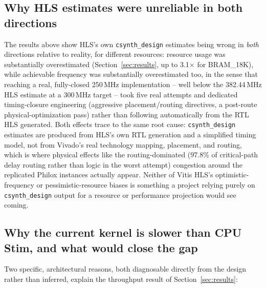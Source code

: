 \documentclass[pdflatex,sn-basic]{sn-jnl}
\begin{document}
\subsection{Why HLS estimates were unreliable in both directions}

The results above show HLS's own \texttt{csynth\_design} estimates being wrong in \emph{both} directions relative to reality, for different resources: resource usage was substantially overestimated (Section~\ref{sec:results}, up to 3.1$\times$ for BRAM\_18K), while achievable frequency was substantially overestimated too, in the sense that reaching a real, fully-closed 250\,MHz implementation -- well below the 382.44\,MHz HLS estimate at a 300\,MHz target -- took five real attempts and dedicated timing-closure engineering (aggressive placement/routing directives, a post-route physical-optimization pass) rather than following automatically from the RTL HLS generated. Both effects trace to the same root cause: \texttt{csynth\_design} estimates are produced from HLS's own RTL generation and a simplified timing model, not from Vivado's real technology mapping, placement, and routing, which is where physical effects like the routing-dominated (97.8\% of critical-path delay routing rather than logic in the worst attempt) congestion around the replicated Philox instances actually appear. Neither of Vitis HLS's optimistic-frequency or pessimistic-resource biases is something a project relying purely on \texttt{csynth\_design} output for a resource or performance projection would see coming.

\subsection{Why the current kernel is slower than CPU Stim, and what would close the gap}

Two specific, architectural reasons, both diagnosable directly from the design rather than inferred, explain the throughput result of Section~\ref{sec:results}:
\end{document}
